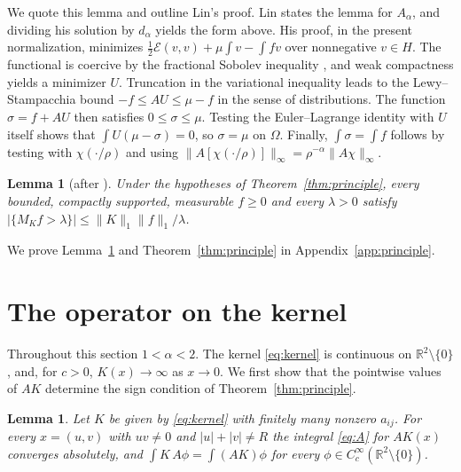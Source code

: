 \documentclass[11pt]{amsart}
\newtheorem{lemma}[equation]{Lemma}
\theoremstyle{definition}
\theoremstyle{remark}
\numberwithin{equation}{section}
\newcommand{\R}{\mathbb{R}}
\newcommand{\Cc}{C_c^\infty}
\begin{document}
We quote this lemma and outline Lin's proof. Lin states the lemma for $A_\alpha$, and dividing his solution by $d_\alpha$ yields the form above. His proof, in the present normalization, minimizes $\frac12\mathcal E(v,v)+\mu\int v-\int fv$ over nonnegative $v\in H$. The functional is coercive by the fractional Sobolev inequality \cite{DNPV12}, and weak compactness yields a minimizer $U$. Truncation in the variational inequality leads to the Lewy--Stampacchia bound $-f\le AU\le\mu-f$ in the sense of distributions. The function $\sigma=f+AU$ then satisfies $0\le\sigma\le\mu$. Testing the Euler--Lagrange identity with $U$ itself shows that $\int U(\mu-\sigma)=0$, so $\sigma=\mu$ on $\Omega$. Finally, $\int\sigma=\int f$ follows by testing with $\chi(\cdot/\rho)$ and using $\|A[\chi(\cdot/\rho)]\|_\infty=\rho^{-\alpha}\|A\chi\|_\infty$.

\begin{lemma}[after {\cite[Lemma~3]{Lin26a}}]\label{lem:transfer}
Under the hypotheses of Theorem~\ref{thm:principle}, every bounded, compactly supported, measurable $f\ge0$ and every $\lambda>0$ satisfy $|\{M_Kf>\lambda\}|\le\|K\|_1\|f\|_1/\lambda$.
\end{lemma}

We prove Lemma~\ref{lem:transfer} and Theorem~\ref{thm:principle} in Appendix~\ref{app:principle}.

\section{The operator on the kernel}\label{sec:closed}

Throughout this section $1<\alpha<2$. The kernel \eqref{eq:kernel} is continuous on $\R^2\setminus\{0\}$, and, for $c>0$, $K(x)\to\infty$ as $x\to0$. We first show that the pointwise values of $AK$ determine the sign condition of Theorem~\ref{thm:principle}.

\begin{lemma}\label{lem:regularity}
Let $K$ be given by \eqref{eq:kernel} with finitely many nonzero $a_{ij}$. For every $x=(u,v)$ with $uv\ne0$ and $|u|+|v|\ne R$ the integral \eqref{eq:A} for $AK(x)$ converges absolutely, and $\int K\,A\phi=\int(AK)\phi$ for every $\phi\in\Cc(\R^2\setminus\{0\})$.
\end{lemma}
\end{document}
